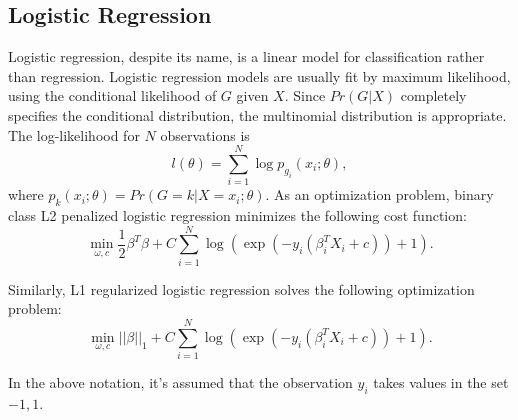 \documentclass[10pt,journal,compsoc]{IEEEtran}
\begin{document}
\subsection{Logistic Regression}
\label{subsec:logistic_regression}
Logistic regression, despite its name, is a linear model for classification rather than regression. Logistic regression models are usually fit by maximum likelihood, using the conditional likelihood of $G$ given $X$. Since $Pr(G|X)$ completely specifies the conditional distribution, the multinomial distribution is appropriate. The log-likelihood for $N$ observations is
\begin{equation}
  l(\theta) = \sum_{i=1}^N\log p_{g_i}(x_i;\theta),
\end{equation}
where $p_k(x_i;\theta) = Pr(G=k|X=x_i;\theta)$. As an optimization problem, binary class L2 penalized logistic regression minimizes the following cost function:
\begin{equation}
  \min_{\omega, c} \frac{1}{2}\beta^T\beta + C\sum_{i=1}^N\log(\exp(-y_i(\beta_i^TX_i + c)) + 1).
\end{equation}

Similarly, L1 regularized logistic regression solves the following optimization problem:
\begin{equation}
  \min_{\omega, c} ||\beta||_1 + C\sum_{i=1}^N\log(\exp(-y_i(\beta_i^TX_i + c)) + 1).
\end{equation}

In the above notation, it's assumed that the observation $y_i$ takes values in the set $-1, 1$.
\end{document}
